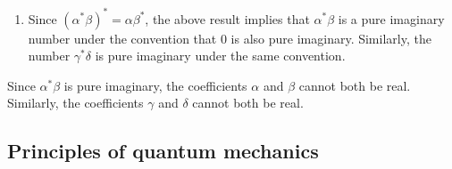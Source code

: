 \begin{answer}
\begin{enumerate}
		      Since $\braket{r \mid i} = \frac{1}{\sqrt{2}} \left(\alpha + \beta\right)$ and $\braket{ i \mid r} = \frac{1}{\sqrt{2}}\left(\alpha^* + \beta^*\right)$, it follows that $\frac{1}{2} = \braket{i \mid r} \braket{r \mid i} = \frac{1}{2}\left(\alpha^* \alpha + \beta^* \beta + \alpha^* \beta + \alpha \beta^*\right)$ and thus that $\alpha^* \beta + \alpha \beta^* = 0$.
		      Since $\braket{o \mid r} \braket{r \mid o} = \frac{1}{2}\left(\gamma^* \gamma + \delta^* \delta + \gamma^* \delta + \gamma \delta^*\right)$, it follows that $\gamma^* \delta + \gamma \delta^* = 0$.
		\item Since $\left(\alpha^* \beta\right)^* = \alpha \beta^*$, the above result implies that $\alpha^* \beta$ is a pure imaginary number under the convention that $0$ is also pure imaginary.
		      Similarly, the number $\gamma^* \delta$ is pure imaginary under the same convention.
	\end{enumerate}
	Since $\alpha^* \beta$ is pure imaginary, the coefficients $\alpha$ and $\beta$ cannot both be real.
	Similarly, the coefficients $\gamma$ and $\delta$ cannot both be real.
\end{answer}

\subsection{Principles of quantum mechanics}

